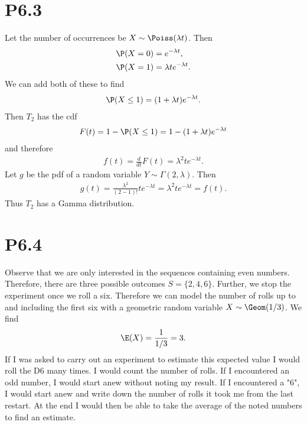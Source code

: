 \documentclass{article}
\begin{document}
\section*{P6.3}


Let the number of occurrences be $X\sim\Poiss(\lambda t)$. Then
\begin{align*}
	\P(X=0) & =e^{-\lambda t},          \\
	\P(X=1) & =\lambda te^{-\lambda t}.
\end{align*}
We can add both of these to find
\begin{align*}
	\P(X\leq 1) = (1+\lambda t)e^{-\lambda t}.
\end{align*}
Then $T_2$ has the cdf
\begin{align*}
	F(t) = 1 - \P(X\leq 1) = 1-(1+\lambda t)e^{-\lambda t}
\end{align*}
and therefore
\begin{align*}
	f(t) = \frac{d}{dt}F(t) = \lambda^2te^{-\lambda t}.
\end{align*}
Let $g$ be the pdf of a random variable $Y\sim\Gamma(2,\lambda)$. Then
\begin{align*}
	g(t) = \frac{\lambda^2}{(2-1)!}te^{-\lambda t} = \lambda^2te^{-\lambda t} = f(t).
\end{align*}
Thus $T_2$ has a Gamma distribution.


\section*{P6.4}


Observe that we are only interested in the sequences containing even numbers.
Therefore, there are three possible outcomes $S=\{2,4,6\}$. Further,
we stop the experiment once we roll a six. Therefore we can model the
number of rolls up to and including the first six with a geometric random
variable $X\sim\Geom(1/3)$. We find
\begin{align*}
	\E(X)=\frac{1}{1/3} = 3.
\end{align*}
If I was asked to carry out an experiment to estimate this expected value
I would roll the D6 many times. I would count the number of rolls. If I
encountered an odd number, I would start anew without noting my result.
If I encountered a "6", I would start anew and write down the number of
rolls it took me from the last restart. At the end I would then be able
to take the average of the noted numbers to find an estimate.
\end{document}
